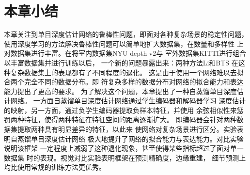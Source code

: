 \section{本章小结}
本章关注到单目深度估计网络的鲁棒性问题，即面对各种复杂场景的稳定性问题，
使用深度学习的方法解决鲁棒性问题可以简单地扩大数据集，在数量和多样性
上对数据集进行丰富。在将室内数据集NYU depth v2与
室外数据集KITTI进行组合以丰富数据集并进行训练以后，
一个新的问题暴露出来：两种方法Li\cite{DABC}和BTS
\cite{bts}在这种复杂数据集上的表现都有了不同程度的退化。
这是由于使用一个网络难以去拟合两个完全不同的数据分布。即
符复杂多样的数据分布对网络的拟合能力和表达能力提出了更高的要求。
为了解决这个问题，本章提出了一种自蒸馏单目深度估计网络。
一方面自蒸馏单目深度估计网络通过学生编码器和解码器学习
深度估计的映射，另一方面，通过负学生编码器提取负样本特征，并使用
余弦相似性来惩罚两种特征，使得两种特征在特征空间的距离逐渐扩大。
即编码器会针对两种数据集提取两种具有明显差异的特征，以此来
使网络对复杂场景进行区分。实验表明自蒸馏单目深度估计网络
极大地提升了网络的拟合能力与表达能力。对比实验说明该框架
一定程度上减弱了这种退化现象，甚至使得某些指标超过了面对单一数据集
时的表现。视觉对比实验表明框架在预测精确度，边缘重建，
细节预测上均比使用常规的训练方法更优秀。





